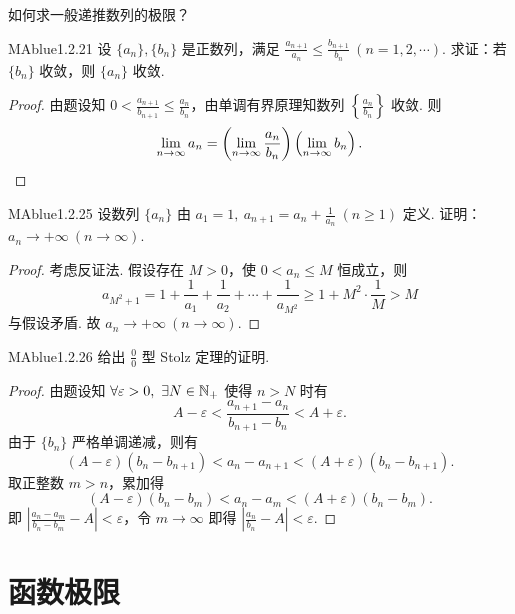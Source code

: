 \begin{think}
    如何求一般递推数列的极限？
\end{think}

\begin{problem}{MAblue}{1.2.21}
    设 $\{ a_n \}, \{ b_n \}$ 是正数列，满足 $\frac{a_{n+1}}{a_n} \leqslant \frac{b_{n+1}}{b_n} \ (n = 1, 2, \cdots)$. 求证：若 $\{ b_n \}$ 收敛，则 $\{ a_n \}$ 收敛.
\end{problem}

\begin{proof}
    由题设知 $0 < \frac{a_{n+1}}{b_{n+1}} \leqslant \frac{a_n}{b_n}$，由单调有界原理知数列 $\left\{ \frac{a_n}{b_n} \right\}$ 收敛. 则
    \[
        \lim_{n \to \infty} a_n = \left( \lim_{n \to \infty} \frac{a_n}{b_n} \right) \left(\lim_{n \to \infty} b_n \right). \qedhere
    \]
\end{proof}

\begin{problem}{MAblue}{1.2.25}
    设数列 $\{ a_n \}$ 由 $a_1 = 1,\ a_{n+1} = a_n + \frac 1 {a_n} \ (n \geqslant 1)$ 定义. 证明：$a_n \to +\infty \ (n \to \infty)$.
\end{problem}

\begin{proof}
    考虑反证法. 假设存在 $M > 0$，使 $0 < a_n \leqslant M$ 恒成立，则
    \[
        a_{M^2+1} = 1 + \frac 1 {a_1} + \frac 1 {a_2} + \cdots + \frac 1 {a_{M^2}} \geqslant 1 + M^2 \cdot \frac 1 M > M
    \]
    与假设矛盾. 故 $ a_n \to +\infty \ (n \to \infty)$.
\end{proof}

\begin{problem}{MAblue}{1.2.26}
    给出 $\frac 0 0$ 型 Stolz 定理的证明.
\end{problem}

\begin{proof}
    由题设知 $\forall \varepsilon > 0,\ \exists N \in \mathbb N_+$ 使得 $n > N$ 时有
    \[
        A - \varepsilon < \frac{a_{n+1} - a_n}{b_{n+1} - b_n} < A + \varepsilon.
    \]
    由于 $\{ b_n \}$ 严格单调递减，则有
    \[
        (A - \varepsilon)(b_n - b_{n+1}) < a_n - a_{n+1} < (A + \varepsilon)(b_n - b_{n+1}).
    \]
    取正整数 $m > n$，累加得
    \[
        (A - \varepsilon)(b_n - b_m) < a_n - a_m < (A + \varepsilon)(b_n - b_m).
    \]
    即 $\left| \frac{a_n - a_m}{b_n - b_m} - A \right| < \varepsilon$，令 $m \to \infty$ 即得 $\left| \frac{a_n}{b_n} - A \right| < \varepsilon$.
\end{proof}

\section{函数极限}

